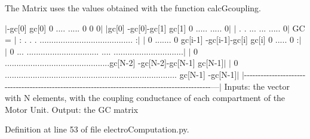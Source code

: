 The Matrix uses the values obtained with the function calc\-Gcoupling. 

 $\vert$-\/gc\mbox{[}0\mbox{]} gc\mbox{[}0\mbox{]} 0 .... ..... 0 0 0$\vert$ $\vert$gc\mbox{[}0\mbox{]} -\/gc\mbox{[}0\mbox{]}-\/gc\mbox{[}1\mbox{]} gc\mbox{[}1\mbox{]} 0 ..... ..... 0$\vert$ $\vert$ . . ... ... ..... 0$\vert$ G\-C = $\vert$ \-: . . . ........................................ \-:$\vert$ $\vert$ 0 ....... 0 gc\mbox{[}i-\/1\mbox{]} -\/gc\mbox{[}i-\/1\mbox{]}-\/gc\mbox{[}i\mbox{]} gc\mbox{[}i\mbox{]} 0 ..... 0 \-:$\vert$ $\vert$ 0 ... ............................... .... ..............................$\vert$ $\vert$ 0 .............................................gc\mbox{[}N-\/2\mbox{]} -\/gc\mbox{[}N-\/2\mbox{]}-\/gc\mbox{[}N-\/1\mbox{]} gc\mbox{[}N-\/1\mbox{]}$\vert$ $\vert$ 0 .......................................................................... gc\mbox{[}N-\/1\mbox{]} -\/gc\mbox{[}N-\/1\mbox{]}$\vert$ $\vert$-\/-\/-\/-\/-\/-\/-\/-\/-\/-\/-\/-\/-\/-\/-\/-\/-\/-\/-\/-\/-\/-\/-\/-\/-\/-\/-\/-\/-\/-\/-\/-\/-\/-\/-\/-\/-\/-\/-\/-\/-\/-\/-\/-\/-\/-\/-\/-\/-\/-\/-\/-\/-\/-\/-\/-\/-\/-\/-\/-\/-\/-\/-\/-\/-\/-\/-\/-\/-\/-\/-\/-\/-\/-\/-\/-\/-\/-\/-\/-\/-\/-\/-\/-\/-\/-\/-\/-\/-\/-\/-\/-\/-\/-\/-\/-\/---$\vert$ Inputs\-: the vector with N elements, with the coupling conductance of each compartment of the Motor Unit. Output\-: the G\-C matrix 

Definition at line 53 of file electro\-Computation.\-py.

